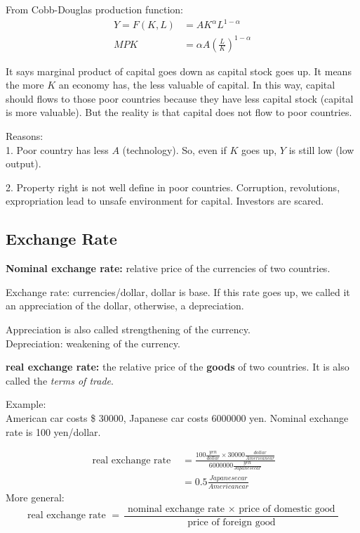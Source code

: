 \documentclass[12pt]{article}
\begin{document}
From Cobb-Douglas production function:
\begin{align*}
Y = F(K,L) &= AK^{\alpha}L^{1 - \alpha}\\
MPK &= \alpha A \left( \frac{L}{K} \right) ^{1 - \alpha}
\end{align*}

It says marginal product of capital goes down as capital stock goes up.
It means the more $ K $ an economy has, the less valuable of capital.
In this way, capital should flows to those poor countries because they have less
capital stock (capital is more valuable). But the reality is that capital does not
flow to poor countries.

Reasons:\\
1. Poor country has less $ A $ (technology). So, even if $ K $ goes up, $ Y $
is still low (low output).

2. Property right is not well define in poor countries. Corruption, revolutions, 
expropriation lead to unsafe environment for capital. Investors are scared.








\subsection{Exchange Rate}
{\textbf {Nominal exchange rate:}} relative price of the currencies of two countries.

Exchange rate: currencies/dollar, dollar is base.
If this rate goes up, we called it an appreciation of the dollar, otherwise, 
a depreciation.

Appreciation is also called strengthening of the currency.\\
Depreciation: weakening of the currency.



{\textbf {real exchange rate:}} the relative price of the {\textbf {goods}} of two 
countries. It is also called the \textit{terms of trade}.

Example:\\
American car costs \$ 30000, Japanese car costs 6000000 yen. Nominal exchange rate
is 100 yen/dollar.

\begin{align*}
\text{ real exchange rate } &= \frac{100 \frac{yen}{dollar} \times 30000
\frac{dollar}{American car}}{6000000 \frac{yen}{Japanese car}}\\
 &= 0.5 \frac{Japanese car}{American car}
\end{align*}
More general:
\begin{equation*}
\text{ real exchange rate } = \frac{\text{ nominal exchange rate } \times 
\text{ price of domestic good }}{\text{ price of foreign good }}
\end{equation*}
\end{document}
